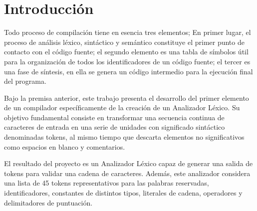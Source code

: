 \documentclass[12pt,letterpaper]{article}
\begin{document}
\newpage
{} %
\tableofcontents
\newpage


\section{Introducción}

Todo proceso de compilación tiene en esencia tres elementos; En primer lugar, el proceso de análisis léxico, sintáctico y semántico constituye el primer punto de contacto con el código fuente; el segundo elemento es una tabla de símbolos útil para la organización de todos los identificadores de un código fuente; el tercer es una fase de síntesis, en ella se genera un código intermedio para la ejecución final del programa.

Bajo la premisa anterior, este trabajo presenta el desarrollo del primer elemento de un compilador específicamente de la creación de un Analizador Léxico. Su objetivo fundamental consiste en transformar una secuencia continua de caracteres de entrada en una serie de unidades con significado sintáctico denominadas tokens, al mismo tiempo que descarta elementos no significativos como espacios en blanco y comentarios.

El resultado del proyecto es un Analizador Léxico capaz de generar una salida de tokens para validar una cadena de caracteres. Además, este analizador considera una lista de 45 tokens representativos para las palabras reservadas, identificadores, constantes de distintos tipos, literales de cadena, operadores y delimitadores de puntuación.
\end{document}
